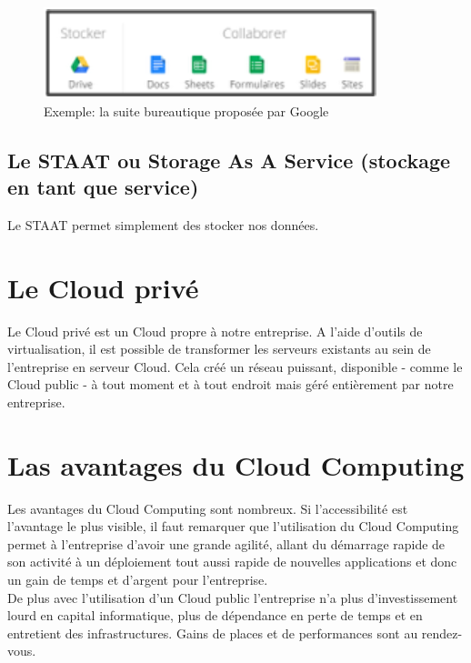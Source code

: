     \begin{figure}
      \begin{center}
        \includegraphics[scale=1]{images/googleDrive.png}
      \end{center}
      \caption{Exemple: la suite bureautique proposée par Google}
      \label{Google Cloud}
    \end{figure}

    \subsection{Le STAAT ou Storage As A Service (stockage en tant que service)}
    Le STAAT permet simplement des stocker nos données.

  \section{Le Cloud privé}
  Le Cloud privé est un Cloud propre à notre entreprise. A l’aide d’outils de virtualisation, il est possible de transformer les serveurs existants au sein de l’entreprise en serveur Cloud. Cela créé un réseau puissant, disponible - comme le Cloud public - à tout moment et à tout endroit mais géré entièrement par notre entreprise.

  \section{Las avantages du Cloud Computing}
  Les avantages du Cloud Computing sont nombreux. Si l’accessibilité est l’avantage le plus visible, il faut remarquer que l’utilisation du Cloud Computing permet à l’entreprise d’avoir une grande agilité, allant du démarrage rapide de son activité à un déploiement tout aussi rapide de nouvelles applications et donc un gain de temps et d’argent pour l’entreprise.\\

  De plus avec l’utilisation d’un Cloud public l’entreprise n’a plus d’investissement lourd en capital informatique, plus de dépendance en perte de temps et en entretient des infrastructures. Gains de places et de performances sont au rendez-vous.\\

